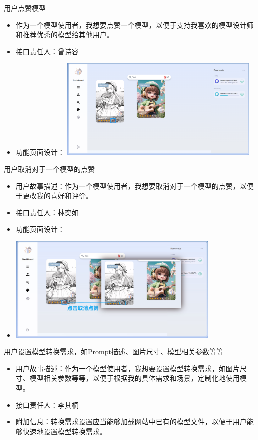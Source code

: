 \begin{frame}{用户点赞模型}
    \begin{itemize}
        \item 作为一个模型使用者，我想要点赞一个模型，以便于支持我喜欢的模型设计师和推荐优秀的模型给其他用户。
        \item 接口责任人：曾诗容
        \item 功能页面设计： %
        \includegraphics[width=3.8in]{contents/figure/like_model_demo.png}
    \end{itemize}
\end{frame}

\begin{frame}{用户取消对于一个模型的点赞}
    \begin{itemize}
        \item 用户故事描述：作为一个模型使用者，我想要取消对于一个模型的点赞，以便于更改我的喜好和评价。
        \item 接口责任人：林奕如
        \item 功能页面设计：
        \item \includegraphics[width=0.8\textwidth]{contents/figure/model_remove_liked.png}
    \end{itemize}
\end{frame}

\begin{frame}{用户设置模型转换需求，如Prompt描述、图片尺寸、模型相关参数等等}
    \begin{itemize}
        \item 用户故事描述：作为一个模型使用者，我想要设置模型转换需求，如图片尺寸、模型相关参数等等，以便于根据我的具体需求和场景，定制化地使用模型。
        \item 接口责任人：李其桐
        \item 附加信息：转换需求设置应当能够加载网站中已有的模型文件，以便于用户能够快速地设置模型转换需求。
    \end{itemize}
\end{frame}


